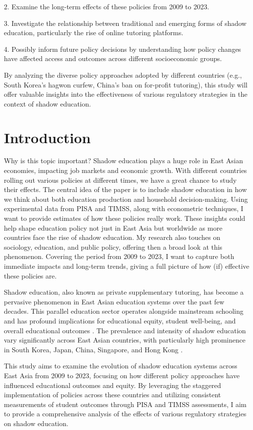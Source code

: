 \documentclass[12pt,a4paper,onecolumn]{article}
\numberwithin{equation}{section}
\begin{document}
2. Examine the long-term effects of these policies from 2009 to 2023.

3. Investigate the relationship between traditional and emerging forms of shadow education, particularly the rise of online tutoring platforms.

4. Possibly inform future policy decisions by understanding how policy changes have affected access and outcomes across different socioeconomic groups.

By analyzing the diverse policy approaches adopted by different countries (e.g., South Korea's hagwon curfew, China's ban on for-profit tutoring), this study will offer valuable insights into the effectiveness of various regulatory strategies in the context of shadow education.
\section{Introduction}

Why is this topic important?
Shadow education plays a huge role in East Asian economies, impacting job markets and economic growth. With different countries rolling out various policies at different times, we have a great chance to study their effects. The central idea of the paper is to include shadow education in how we think about both education production and household decision-making. Using experimental data from PISA and TIMSS, along with econometric techniques, I want to provide estimates of how these policies really work. These insights could help shape education policy not just in East Asia but worldwide as more countries face the rise of shadow education. My research also touches on sociology, education, and public policy, offering then a broad look at this phenomenon. Covering the period from 2009 to 2023, I want to capture both immediate impacts and long-term trends, giving a full picture of how (if) effective these policies are.

Shadow education, also known as private supplementary tutoring, has become a pervasive phenomenon in East Asian education systems over the past few decades. This parallel education sector operates alongside mainstream schooling and has profound implications for educational equity, student well-being, and overall educational outcomes \parencite{Bray2009}. The prevalence and intensity of shadow education vary significantly across East Asian countries, with particularly high prominence in South Korea, Japan, China, Singapore, and Hong Kong \parencite{Bray2021}.

This study aims to examine the evolution of shadow education systems across East Asia from 2009 to 2023, focusing on how different policy approaches have influenced educational outcomes and equity. By leveraging the staggered implementation of policies across these countries and utilizing consistent measurements of student outcomes through PISA and TIMSS assessments, I aim to provide a comprehensive analysis of the effects of various regulatory strategies on shadow education.
\end{document}
